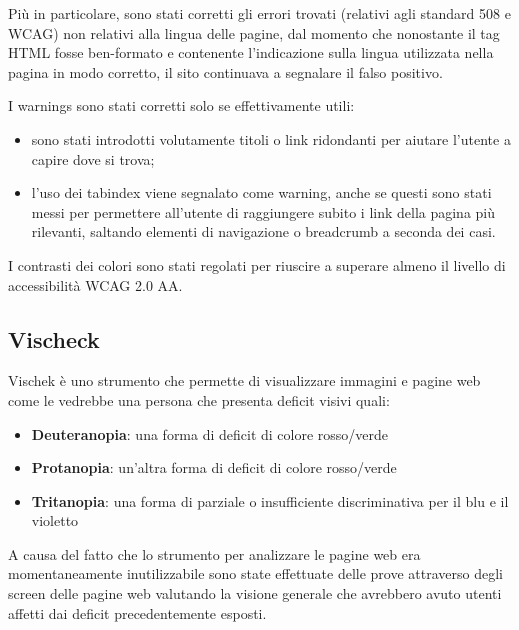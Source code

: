 Più in particolare, sono stati corretti gli errori trovati (relativi agli
standard 508 e WCAG) non relativi alla lingua delle pagine, dal momento che
nonostante il tag HTML fosse ben-formato e contenente l'indicazione sulla
lingua utilizzata nella pagina in modo corretto, il sito continuava a
segnalare il falso positivo.

I warnings sono stati corretti solo se effettivamente utili:
\begin{itemize}
\item sono stati introdotti volutamente titoli o link ridondanti per
aiutare l'utente a capire dove si trova;
\item l'uso dei tabindex viene segnalato come warning, anche se questi sono
stati messi per permettere all'utente di raggiungere subito i link della
pagina più rilevanti, saltando elementi di navigazione o breadcrumb a seconda
dei casi.
\end{itemize}

I contrasti dei colori sono stati regolati per riuscire a superare almeno il
livello di accessibilità WCAG 2.0 AA.

\subsection{Vischeck}
Vischek è uno strumento che permette di visualizzare immagini e pagine web
come le vedrebbe una persona che presenta deficit visivi quali:
\begin{itemize}
\item \textbf{Deuteranopia}: una forma di deficit di colore rosso/verde
\item \textbf{Protanopia}: un'altra forma di deficit di colore rosso/verde
\item \textbf{Tritanopia}: una forma di parziale o insufficiente
discriminativa per il blu e il violetto
\end{itemize}
A causa del fatto che lo strumento per analizzare le pagine web era momentaneamente inutilizzabile sono state effettuate delle prove attraverso degli screen delle pagine web
valutando la visione generale che avrebbero avuto utenti affetti dai deficit precedentemente
esposti.


